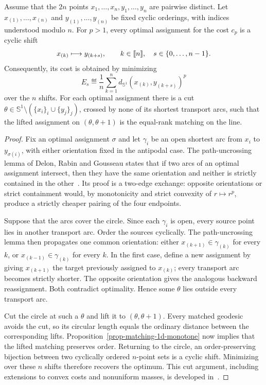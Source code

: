 \begin{proposition}\label{prop-circle-ot-cut}
	Assume that the $2n$ points $x_1,\ldots,x_n,y_1,\ldots,y_n$ are pairwise distinct. Let $x_{(1)},\ldots,x_{(n)}$ and $y_{(1)},\ldots,y_{(n)}$ be fixed cyclic orderings, with indices understood modulo $n$. For $p>1$, every optimal assignment for the cost $c_p$ is a cyclic shift
	\[
		x_{(k)}\longmapsto y_{(k+s)},
		\qquad k\in\llbracket n\rrbracket,\quad s\in\{0,\ldots,n-1\}.
	\]
	Consequently, its cost is obtained by minimizing
	\[
		E_s
		\eqdef
		\frac1n\sum_{k=1}^n
		d_{\mathbb S^1}\!\left(x_{(k)},y_{(k+s)}\right)^p
	\]
	over the $n$ shifts. For each optimal assignment there is a cut $\theta\in\mathbb S^1\setminus(\{x_i\}_i\cup\{y_j\}_j)$, crossed by none of its shortest transport arcs, such that the lifted assignment on $(\theta,\theta+1)$ is the equal-rank matching on the line.
\end{proposition}

\begin{proof}
	Fix an optimal assignment $\sigma$ and let $\gamma_i$ be an open shortest arc from $x_i$ to $y_{\sigma(i)}$, with either orientation fixed in the antipodal case. The path-uncrossing lemma of Delon, Rabin and Gousseau states that if two arcs of an optimal assignment intersect, then they have the same orientation and neither is strictly contained in the other~\cite{DelonRabinGousseau2011Circle}. Its proof is a two-edge exchange: opposite orientations or strict containment would, by monotonicity and strict convexity of $r\mapsto r^p$, produce a strictly cheaper pairing of the four endpoints.

	Suppose that the arcs cover the circle. Since each $\gamma_i$ is open, every source point lies in another transport arc. Order the sources cyclically. The path-uncrossing lemma then propagates one common orientation: either $x_{(k+1)}\in\gamma_{(k)}$ for every $k$, or $x_{(k-1)}\in\gamma_{(k)}$ for every $k$. In the first case, define a new assignment by giving $x_{(k+1)}$ the target previously assigned to $x_{(k)}$; every transport arc becomes strictly shorter. The opposite orientation gives the analogous backward reassignment. Both contradict optimality. Hence some $\theta$ lies outside every transport arc.

	Cut the circle at such a $\theta$ and lift it to $(\theta,\theta+1)$. Every matched geodesic avoids the cut, so its circular length equals the ordinary distance between the corresponding lifts. Proposition~\ref{prop-matching-1d-monotone} now implies that the lifted matching preserves order. Returning to the circle, an order-preserving bijection between two cyclically ordered $n$-point sets is a cyclic shift. Minimizing over these $n$ shifts therefore recovers the optimum. This cut argument, including extensions to convex costs and nonuniform masses, is developed in~\cite{DelonRabinGousseau2011Circle,delon-circle}.
\end{proof}

